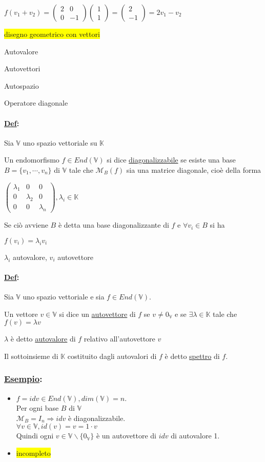\documentclass{article}
\newcommand{\hl}[1]{\colorbox{yellow}{#1}}
\newcommand{\ul}[1]{\underline{#1}}
\newcommand{\K}{\mathbb{K}}
\newcommand{\V}{\mathbb{V}}
\newcommand{\M}{\mathcal{M}}
\newcommand{\Def}[2]{\paragraph{\ul{Def}:}#1\\\hspace*{3em}\begin{minipage}{.8\textwidth}#2\end{minipage}}
\newcommand{\Esempio}[1]{\subsubsection*{\ul{Esempio}:}#1}
\begin{document}
$f(v_1+v_2)=\begin{pmatrix}2&0\\0&-1\end{pmatrix}\begin{pmatrix}1\\1\end{pmatrix}=\begin{pmatrix}2\\-1\end{pmatrix}=2v_1-v_2$

\hl{disegno geometrico con vettori}

Autovalore

Autovettori

Autospazio

Operatore diagonale



\Def{Sia $\V$ uno spazio vettoriale su $\K$}{
	Un endomorfismo $f\in End(\V)$ si dice \ul{diagonalizzabile} se esiste una base $B=\{v_1,\cdots,v_n\}$ di $\V$ tale che $\M_B(f)$ sia una matrice diagonale, cioè della forma

	$\begin{pmatrix}
		\lambda_1 & 0         & 0         \\
		0         & \lambda_2 & 0         \\
		0         & 0         & \lambda_n
	\end{pmatrix},\lambda_i\in\K$

	Se ciò avviene $B$ è detta una base diagonalizzante di $f$ e $\forall v_i\in B$ si ha

	$f(v_i)=\lambda_iv_i$

	$\lambda_i$ autovalore, $v_i$ autovettore
}

\Def{Sia $\V$ uno spazio vettoriale e sia $f\in End(\V)$.}{
	Un vettore $v\in\V$ si dice un \ul{autovettore} di $f$ se $v\not=0_\V$ e se $\exists\lambda\in\K$ tale che $f(v)=\lambda v$

	$\lambda$ è detto \ul{autovalore} di $f$ relativo all'autovettore $v$

	Il sottoinsieme di $\K$ costituito dagli autovalori di $f$ è detto \ul{spettro} di $f$.
}

\Esempio{
	\begin{itemize}
		\item $f=idv\in End(\V),dim(\V)=n$.\\
		  Per ogni base $B$ di $\V$\\
		  $\M_B=I_n\Rightarrow idv$ è diagonalizzabile.\\
		  $\forall v\in\V, id(v)=v=1\cdot v$\\
		  Quindi ogni $v\in\V\backslash\{0_\V\}$ è un autovettore di $idv$ di autovalore 1.
		\item \hl{incompleto}
	\end{itemize}
}
\end{document}
